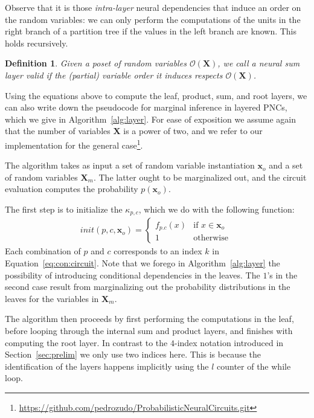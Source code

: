 \documentclass[letterpaper]{article} %
\newtheorem{definition}[theorem]{Definition}
\newcommand{\Xvars}{\ensuremath{\mathbf{X}}}
\newcommand{\xvars}{\ensuremath{\mathbf{x}}}
\newcommand{\xvar}{\ensuremath{x}}
\newcommand{\poset}{\ensuremath{\mathcal{O}}}
\newcommand{\component}{\ensuremath{{\kappa}}}
\begin{document}
Observe that it is those \textit{intra-layer} neural dependencies that induce an order on the random variables: we can only perform the computations of the units in the right branch of a partition tree if the values in the left branch are known. This holds recursively.
\begin{definition}
    Given a poset of random variables $\poset (\Xvars)$, we call a neural sum layer valid if the (partial) variable order it induces respects $\poset(\Xvars)$.
\end{definition}






Using the equations above to compute the leaf, product, sum, and root layers, we can also write down the pseudocode for marginal inference in layered PNCs, which we give in Algorithm~\ref{alg:layer}.
For ease of exposition we assume again that the number of variables $\Xvars$ is a power of two, and we refer to our implementation for the general case\footnote{\url{https://github.com/pedrozudo/ProbabilisticNeuralCircuits.git}}.






The algorithm takes as input a set of random variable instantiation $\xvars_o$ and a set of random variables $\Xvars_m$. The latter ought to be marginalized out, and the circuit evaluation computes the probability $p(\xvars_o)$.

The first step is to initialize the $\component_{p,c}$, which we do with the following function:
\begin{align}
    init(p,c,\xvars_o)
    =
    \begin{cases}
        f_{p.c}(\xvar) & \text{if $\xvar \in \xvars_o$  } \\
        1              & \text{otherwise}
    \end{cases}
\end{align}
Each combination of $p$ and $c$ corresponds to an index $k$ in Equation~\ref{eq:con:circuit}. Note that we forego in Algorithm~\ref{alg:layer} the possibility of introducing conditional dependencies in the leaves. The $1$'s in the second case result from marginalizing out the probability distributions in the leaves for the variables in $\Xvars_m$.





The algorithm then proceeds by first performing the computations in the leaf, before looping through the internal sum and product layers, and finishes with computing the root layer.
In contrast to the $4$-index notation introduced in Section~\ref{sec:prelim} we only use two indices here. This is because the identification of the layers happens implicitly using the $l$ counter of the while loop.
\end{document}

